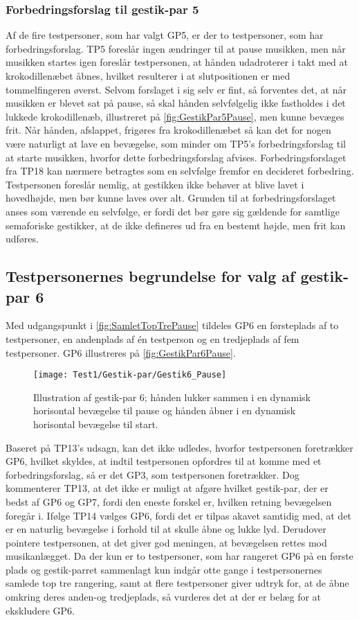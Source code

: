 \subsubsection{Forbedringsforslag til gestik-par 5}
\label{TestresultaterValgAfGestikkerForbedringGP5}
%
Af de fire testpersoner, som har valgt GP5, er der to testpersoner, som har forbedringsforslag. TP5 foreslår ingen ændringer til at pause musikken, men når musikken startes igen foreslår testpersonen, at hånden udadroterer i takt med at krokodillenæbet åbnes, hvilket resulterer i at slutpositionen er med tommelfingeren øverst. Selvom forslaget i sig selv er fint, så forventes det, at når musikken er blevet sat på pause, så skal hånden selvfølgelig ikke fastholdes i det lukkede krokodillenæb, illustreret på \autoref{fig:GestikPar5Pause}, men kunne bevæges frit. Når hånden, afslappet, frigøres fra krokodillenæbet så kan det for nogen være naturligt at lave en bevægelse, som minder om TP5's forbedringsforslag til at starte musikken, hvorfor dette forbedringsforslag afvises. Forbedringsforslaget fra TP18 kan nærmere betragtes som en selvfølge fremfor en decideret forbedring. Testpersonen foreslår nemlig, at gestikken ikke behøver at blive lavet i hovedhøjde, men bør kunne laves over alt. Grunden til at forbedringsforslaget anses som værende en selvfølge, er fordi det bør gøre sig gældende for samtlige semaforiske gestikker, at de ikke defineres ud fra en bestemt højde, men frit kan udføres.
%
\subsection{Testpersonernes begrundelse for valg af gestik-par 6}
\label{TestresultaterValgAfGestikkerBegrundelseGP6}
%
Med udgangspunkt i \autoref{fig:SamletTopTrePause} tildeles GP6 en førsteplads af to testpersoner, en andenplads af én testperson og en tredjeplads af fem testpersoner. GP6 illustreres på \autoref{fig:GestikPar6Pause}.
%
\begin{figure}[H]
	\centering
	\texttt{[image: Test1/Gestik-par/Gestik6\_Pause]}
	\caption{Illustration af gestik-par 6; hånden lukker sammen i en dynamisk horisontal bevægelse til pause og hånden åbner i en dynamisk horisontal bevægelse til start.}
	\label{fig:GestikPar6Pause}
\end{figure}
\noindent
%
Baseret på TP13's udsagn, kan det ikke udledes, hvorfor testpersonen foretrækker GP6, hvilket skyldes, at indtil testpersonen opfordres til at komme med et forbedringsforslag, så er det GP3, som testpersonen foretrækker. Dog kommenterer TP13, at det ikke er muligt at afgøre hvilket gestik-par, der er bedst af GP6 og GP7, fordi den eneste forskel er, hvilken retning bevægelsen foregår i. Ifølge TP14 vælges GP6, fordi det er tilpas akavet samtidig med, at det er en naturlig bevægelse i forhold til at skulle åbne og lukke lyd. Derudover pointere testpersonen, at det giver god meningen, at bevægelsen rettes mod musikanlægget. Da der kun er to testpersoner, som har rangeret GP6 på en første plads og gestik-parret sammenlagt kun indgår otte gange i testpersonernes samlede top tre rangering, samt at flere testpersoner giver udtryk for, at de åbne omkring deres anden-og tredjeplads, så vurderes det at der er belæg for at ekskludere GP6. 
%
